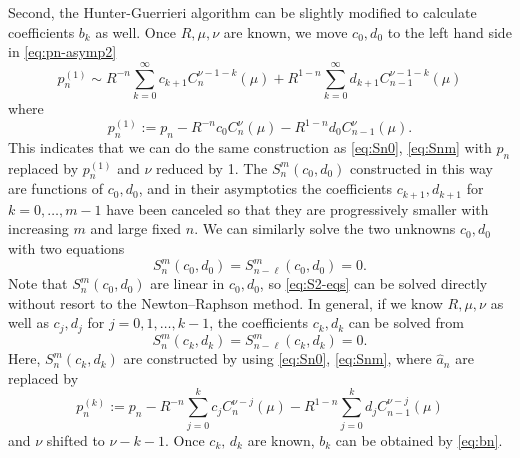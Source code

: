 \documentclass[a4paper,11pt]{article}
\theoremstyle{definition}
\newcommand{\wh}[1]{\widehat{#1}}
\begin{document}
Second, the Hunter-Guerrieri algorithm can be slightly modified to
calculate coefficients $b_k$ as well.  Once $R,\mu,\nu$ are known, we
move $c_0,d_0$ to the left hand side in \eqref{eq:pn-asymp2}
\begin{equation}
  p_n^{(1)}
  \sim R^{-n} \sum_{k=0}^{\infty} c_{k+1} C_n^{\nu-1-k}(\mu)
  +R^{1-n} \sum_{k=0}^{\infty} d_{k+1}C_{n-1}^{\nu-1-k}(\mu)
\end{equation}
where
\begin{equation}
  p_n^{(1)} := p_n
  - R^{-n} c_0 C_{n}^{\nu} (\mu) - R^{1-n} d_0 C_{n-1}^{\nu}(\mu).
\end{equation}
This indicates that we can do the same construction as
\eqref{eq:Sn0}, \eqref{eq:Snm} with $p_n$ replaced by $p_n^{(1)}$ and
$\nu$ reduced by 1. The $S_n^m(c_0,d_0)$ constructed in this way are
functions of $c_0,d_0$, and in their asymptotics the coefficients
$c_{k+1},d_{k+1}$ for $k=0,\ldots,m-1$ have been canceled so that they
are progressively smaller with increasing $m$ and large fixed $n$.  We
can similarly solve the two unknowns $c_0,d_0$ with two equations
\begin{equation}
  S_n^m(c_0,d_0) = S_{n-\ell}^m(c_0,d_0) = 0.
  \label{eq:S2-eqs}
\end{equation}
Note that $S_n^m(c_0,d_0)$ are linear in $c_0,d_0$, so
\eqref{eq:S2-eqs} can be solved directly without resort to the
Newton--Raphson method. In general, if we know $R,\mu,\nu$ as well as
$c_j,d_j$ for $j=0,1,\ldots,k-1$, the coefficients $c_k,d_k$ can be
solved from
%
\begin{equation}
  S_n^m(c_k,d_k) = S_{n-\ell}^m(c_k,d_k) = 0. 
\end{equation}
%
Here, $S_n^m(c_k,d_k)$ are constructed by using
\eqref{eq:Sn0}, \eqref{eq:Snm}, where $\wh{a}_n$ are replaced by
\begin{equation}
  p_n^{(k)} := p_n
  - R^{-n} \sum_{j=0}^{k}c_j C_{n}^{\nu-j} (\mu)
  - R^{1-n}\sum_{j=0}^{k} d_j C_{n-1}^{\nu-j}(\mu) 
\end{equation}
and $\nu$ shifted to $\nu-k-1$. Once $c_k, \, d_k$ are known, $b_k$ can
be obtained by \eqref{eq:bn}.




\linespread{0.6}
%
%

\end{document}
